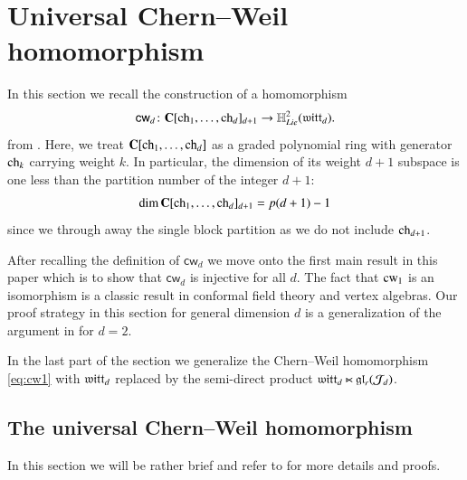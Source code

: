 \documentclass[main.tex]{subfiles}
\begin{document}
\section{Universal Chern--Weil homomorphism}\label{s:chern}

In this section we recall the construction of a homomorphism 
\begin{equation}\label{eq:cw1}
  \mathsf{cw}_d \colon \mathbf{C}[\operatorname{ch}_1,\ldots,\operatorname{ch}_d]_{d+1} \to \mathbb H^2_{Lie} (\mathfrak{witt}_d) .
\end{equation}
from \cite[section 3]{GWvir2d}.
Here, we treat $\mathbf{C}[\operatorname{ch}_1,\ldots,\operatorname{ch}_d]$ as a graded polynomial ring with generator $\operatorname{ch}_k$ carrying weight
$k$.
In particular, the dimension of its weight $d+1$ subspace is one less than the partition number of the integer $d+1$:
\begin{equation}\label{}
  \dim \mathbf{C}[\operatorname{ch}_1,\ldots,\operatorname{ch}_d]_{d+1} = p(d+1) - 1 
\end{equation}
since we through away the single block partition as we do not include $\operatorname{ch}_{d+1}$.

After recalling the definition of $\mathsf{cw}_d$ we move onto the first main result in this paper which is to show that
$\mathsf{cw}_d$ is injective for all $d$.
The fact that $\operatorname{cw}_1$ is an isomorphism is a classic result in conformal field theory and vertex algebras.
Our proof strategy in this section for general dimension $d$ is a generalization of the argument in \cite{GWvir2d}
for $d=2$.

In the last part of the section we generalize the Chern--Weil homomorphism \ref{eq:cw1} with $\mathfrak{witt}_d$ replaced by
the semi-direct product $\mathfrak{witt}_d \ltimes \mathfrak{gl}_r(\mathcal J_d)$.

\subsection{The universal Chern--Weil homomorphism}
In this section we will be rather brief and refer to \cite{GWvir2d} for more details and proofs.
\end{document}
